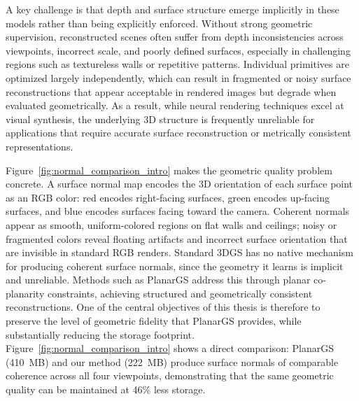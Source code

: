A key challenge is that depth and surface structure emerge implicitly in these models rather than being explicitly enforced. Without strong geometric supervision, reconstructed scenes often suffer from depth inconsistencies across viewpoints, incorrect scale, and poorly defined surfaces, especially in challenging regions such as textureless walls or repetitive patterns. Individual primitives are optimized largely independently, which can result in fragmented or noisy surface reconstructions that appear acceptable in rendered images but degrade when evaluated geometrically. As a result, while neural rendering techniques excel at visual synthesis, the underlying 3D structure is frequently unreliable for applications that require accurate surface reconstruction or metrically consistent representations.

Figure~\ref{fig:normal_comparison_intro} makes the geometric quality problem concrete. A surface normal map encodes the 3D orientation of each surface point as an RGB color: red encodes right-facing surfaces, green encodes up-facing surfaces, and blue encodes surfaces facing toward the camera. Coherent normals appear as smooth, uniform-colored regions on flat walls and ceilings; noisy or fragmented colors reveal floating artifacts and incorrect surface orientation that are invisible in standard RGB renders. Standard 3DGS has no native mechanism for producing coherent surface normals, since the geometry it learns is implicit and unreliable. Methods such as PlanarGS address this through planar co-planarity constraints, achieving structured and geometrically consistent reconstructions. One of the central objectives of this thesis is therefore to preserve the level of geometric fidelity that PlanarGS provides, while substantially reducing the storage footprint. Figure~\ref{fig:normal_comparison_intro} shows a direct comparison: PlanarGS (410~MB) and our method (222~MB) produce surface normals of comparable coherence across all four viewpoints, demonstrating that the same geometric quality can be maintained at 46\% less storage.

